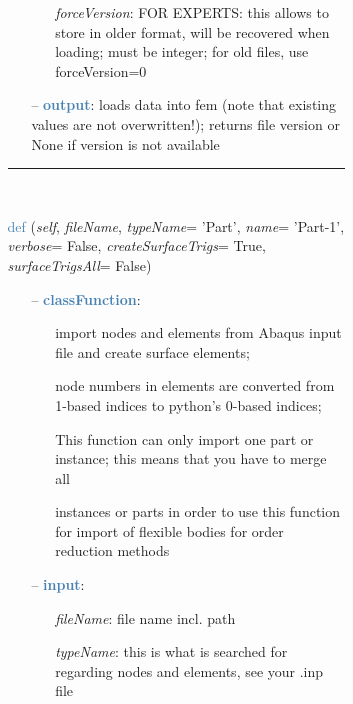 \begin{itemize}[leftmargin=1.4cm]
\begin{itemize}[leftmargin=1.4cm]
\begin{itemize}[leftmargin=1.4cm]
\begin{itemize}[leftmargin=0.5cm]
\begin{itemize}[leftmargin=1.4cm]
\begin{itemize}[leftmargin=1.4cm]
\begin{itemize}[leftmargin=0.5cm]
\begin{itemize}[leftmargin=0.7cm]
\begin{itemize}[leftmargin=1.2cm]
\item[]{\it forceVersion}: FOR EXPERTS: this allows to store in older format, will be recovered when loading; must be integer; for old files, use forceVersion=0
\end{itemize}
\item[--]\textcolor{steelblue}{\bf output}: loads data into fem (note that existing values are not overwritten!); returns file version or None if version is not available
\vspace{12pt}\end{itemize}
%
\noindent\rule{8cm}{0.75pt}\vspace{1pt} \\ 
\begin{flushleft}
\noindent \textcolor{steelblue}{def {\bf {}}}\label{sec:FEM:FEMinterface:ImportFromAbaqusInputFile}
({\it self}, {\it fileName}, {\it typeName}= 'Part', {\it name}= 'Part-1', {\it verbose}= False, {\it createSurfaceTrigs}= True, {\it surfaceTrigsAll}= False)
\end{flushleft}
\setlength{\itemindent}{0.7cm}
\begin{itemize}[leftmargin=0.7cm]
\item[--]\textcolor{steelblue}{\bf classFunction}: \vspace{-6pt}
\begin{itemize}[leftmargin=1.2cm]
\setlength{\itemindent}{-0.7cm}
\item[]import nodes and elements from Abaqus input file and create surface elements;
\item[]node numbers in elements are converted from 1-based indices to python's 0-based indices;
\item[]This function can only import one part or instance; this means that you have to merge all
\item[]instances or parts in order to use this function for import of flexible bodies for order reduction methods
\end{itemize}
\item[--]\textcolor{steelblue}{\bf input}: \vspace{-6pt}
\begin{itemize}[leftmargin=1.2cm]
\setlength{\itemindent}{-0.7cm}
\item[]{\it fileName}: file name incl. path
\item[]{\it typeName}: this is what is searched for regarding nodes and elements, see your .inp file

\end{itemize}
\end{itemize}
\end{itemize}
\end{itemize}
\end{itemize}
\end{itemize}
\end{itemize}
\end{itemize}
\end{itemize}
